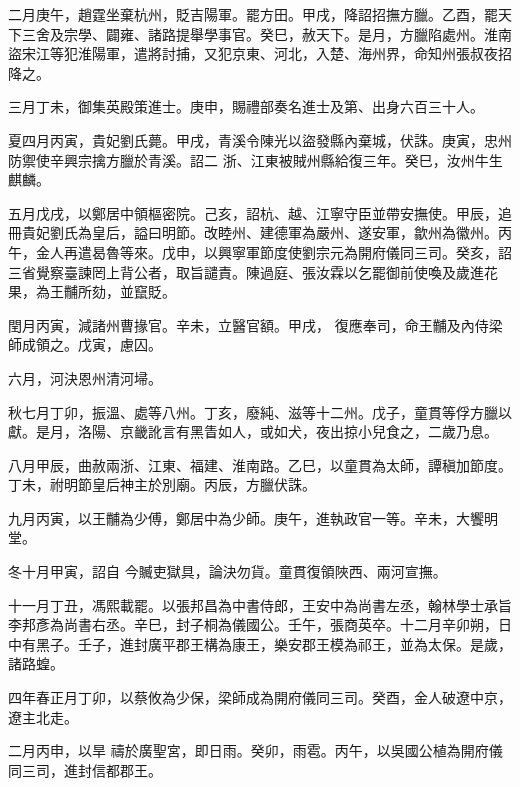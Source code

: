 \begin{pinyinscope}
 二月庚午，趙霆坐棄杭州，貶吉陽軍。罷方田。甲戌，降詔招撫方臘。乙酉，罷天下三舍及宗學、闢雍、諸路提舉學事官。癸巳，赦天下。是月，方臘陷處州。淮南盜宋江等犯淮陽軍，遣將討捕，又犯京東、河北，入楚、海州界，命知州張叔夜招降之。



 三月丁未，御集英殿策進士。庚申，賜禮部奏名進士及第、出身六百三十人。



 夏四月丙寅，貴妃劉氏薨。甲戌，青溪令陳光以盜發縣內棄城，伏誅。庚寅，忠州防禦使辛興宗擒方臘於青溪。詔二
 浙、江東被賊州縣給復三年。癸巳，汝州牛生麒麟。



 五月戊戌，以鄭居中領樞密院。己亥，詔杭、越、江寧守臣並帶安撫使。甲辰，追冊貴妃劉氏為皇后，謚曰明節。改睦州、建德軍為嚴州、遂安軍，歙州為徽州。丙午，金人再遣曷魯等來。戊申，以興寧軍節度使劉宗元為開府儀同三司。癸亥，詔三省覺察臺諫罔上背公者，取旨譴責。陳過庭、張汝霖以乞罷御前使喚及歲進花果，為王黼所劾，並竄貶。



 閏月丙寅，減諸州曹掾官。辛未，立醫官額。甲戌，
 復應奉司，命王黼及內侍梁師成領之。戊寅，慮囚。



 六月，河決恩州清河埽。



 秋七月丁卯，振溫、處等八州。丁亥，廢純、滋等十二州。戊子，童貫等俘方臘以獻。是月，洛陽、京畿訛言有黑眚如人，或如犬，夜出掠小兒食之，二歲乃息。



 八月甲辰，曲赦兩浙、江東、福建、淮南路。乙巳，以童貫為太師，譚稹加節度。丁未，祔明節皇后神主於別廟。丙辰，方臘伏誅。



 九月丙寅，以王黼為少傅，鄭居中為少師。庚午，進執政官一等。辛未，大饗明堂。



 冬十月甲寅，詔自
 今贓吏獄具，論決勿貨。童貫復領陜西、兩河宣撫。



 十一月丁丑，馮熙載罷。以張邦昌為中書侍郎，王安中為尚書左丞，翰林學士承旨李邦彥為尚書右丞。辛巳，封子桐為儀國公。壬午，張商英卒。十二月辛卯朔，日中有黑子。壬子，進封廣平郡王構為康王，樂安郡王模為祁王，並為太保。是歲，諸路蝗。



 四年春正月丁卯，以蔡攸為少保，梁師成為開府儀同三司。癸酉，金人破遼中京，遼主北走。



 二月丙申，以旱
 禱於廣聖宮，即日雨。癸卯，雨雹。丙午，以吳國公植為開府儀同三司，進封信都郡王。




\end{pinyinscope}
